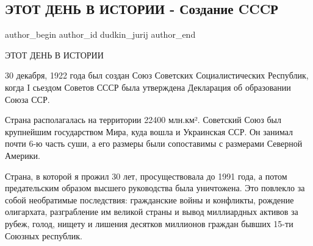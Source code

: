  
 
 
 
 
 
\subsection{ЭТОТ ДЕНЬ В ИСТОРИИ - Создание CCCР}
\label{sec:30_12_2021.fb.dudkin_jurij.1.sozdanie_sssr}
 
\ifcmt
 author_begin
   author_id dudkin_jurij
 author_end
\fi

ЭТОТ ДЕНЬ В ИСТОРИИ

30 декабря, 1922 года был создан Союз Советских Социалистических Республик,
когда I сьездом Советов СССР была утверждена Декларация об образовании Союза
ССР.



Страна располагалась на территории 22400 млн.км². Советский Союз был крупнейшим
государством Мира, куда вошла и Украинская ССР. Он занимал почти 6-ю часть
суши, а его размеры были сопоставимы с размерами Северной Америки.

Страна, в которой я прожил 30 лет, просуществовала до 1991 года, а потом
предательским образом высшего руководства была уничтожена. Это повлекло за
собой необратимые последствия: гражданские войны и конфликты, рождение
олигархата, разграбление им великой страны и вывод миллиардных активов за
рубеж, голод, нищету и лишения десятков миллионов граждан бывших 15-ти Союзных
республик.

